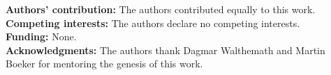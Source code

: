 \documentclass[a4paper, 12pt]{article}
\begin{document}

\newpage
{}








\noindent\small \textbf{Authors' contribution:} The authors contributed equally to this work. \\ 
\noindent\small \textbf{Competing interests:} The authors declare no competing interests.\\
\noindent\small \textbf{Funding:} None.\\
\noindent\small \textbf{Acknowledgments:} The authors thank Dagmar Walthemath  and Martin Boeker  for mentoring the genesis of this work.



\nocite{*}           %
\printbibliography 


\end{document}
